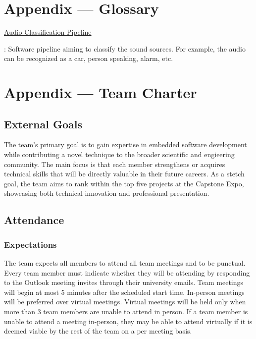 \documentclass{article}
\begin{document}
\newpage{}

\section*{Appendix --- Glossary}


\hypertarget{audio_classification_pipeline}{\underline{Audio Classification
Pipeline}}: Software pipeline aiming to classify the sound sources. For example,
the audio can be recognized as a car, person speaking, alarm, etc.

\newpage{}

\section*{Appendix --- Team Charter}

\subsection*{External Goals}

The team's primary goal is to gain expertise in embedded software development
while contributing a novel technique to the broader scientific and engieering
community. The main focus is that each member strengthens or acquires technical
skills that will be directly valuable in their future careers. As a stetch goal,
the team aims to rank within the top five projects at the Capstone Expo,
showcasing both technical innovation and professional presentation.

\subsection*{Attendance}

\subsubsection*{Expectations}

The team expects all members to attend all team meetings and to be punctual.
Every team member must indicate whether they will be attending by responding to
the Outlook meeting invites through their university emails. Team meetings will
begin at most 5 minutes after the scheduled start time. In-person meetings will
be preferred over virtual meetings. Virtual meetings will be held only when more
than 3 team members are unable to attend in person. If a team member is unable
to attend a meeting in-person, they may be able to attend virtually if it is
deemed viable by the rest of the team on a per meeting basis.
\end{document}

